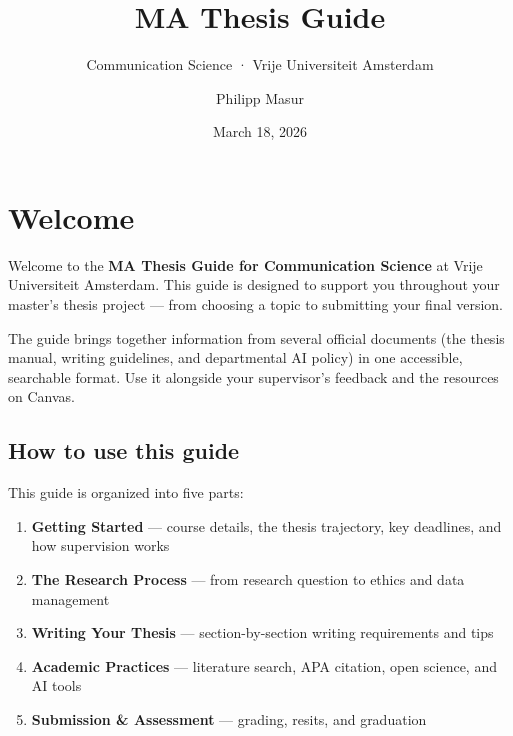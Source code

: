 \documentclass[
  11pt,
  a4paper,
]{scrbook}
\title{MA Thesis Guide}
\subtitle{Communication Science · Vrije Universiteit Amsterdam}
\author{Philipp Masur}
\date{March 18, 2026}
\providecommand{\tightlist}{%
  \setlength{\itemsep}{0pt}\setlength{\parskip}{0pt}}\usepackage{longtable,booktabs,array}
\renewcommand*\contentsname{Table of contents}
\newcommand\contentsname{Table of contents}
\begin{document}
\frontmatter
\maketitle

\renewcommand*\contentsname{Table of contents}
{
\hypersetup{linkcolor=}
\setcounter{tocdepth}{2}
\tableofcontents
}
\mainmatter
{}

\chapter*{Welcome}\label{welcome}


Welcome to the \textbf{MA Thesis Guide for Communication Science} at
Vrije Universiteit Amsterdam. This guide is designed to support you
throughout your master's thesis project --- from choosing a topic to
submitting your final version.

The guide brings together information from several official documents
(the thesis manual, writing guidelines, and departmental AI policy) in
one accessible, searchable format. Use it alongside your supervisor's
feedback and the resources on Canvas.

\section*{How to use this guide}\label{how-to-use-this-guide}


This guide is organized into five parts:

\begin{enumerate}
\def\labelenumi{\arabic{enumi}.}
\tightlist
\item
  \textbf{Getting Started} --- course details, the thesis trajectory,
  key deadlines, and how supervision works
\item
  \textbf{The Research Process} --- from research question to ethics and
  data management
\item
  \textbf{Writing Your Thesis} --- section-by-section writing
  requirements and tips
\item
  \textbf{Academic Practices} --- literature search, APA citation, open
  science, and AI tools
\item
  \textbf{Submission \& Assessment} --- grading, resits, and graduation
\end{enumerate}
\end{document}
